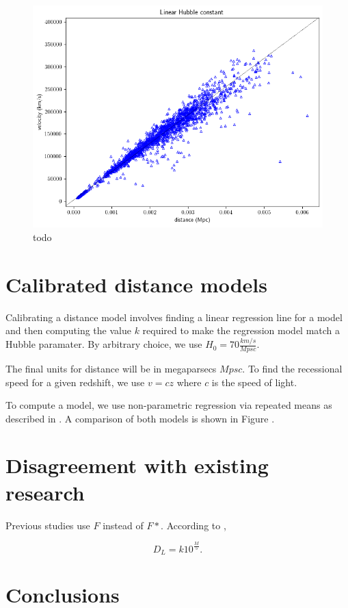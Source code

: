 \documentclass{article}
\begin{document}
\begin{figure}[h!]
  \includegraphics[width=\linewidth]{../graphs/velocity_vs_distance.png}
  \caption{todo}
  \label{fig:uncorrected_uncalibrated}
\end{figure}

\section{Calibrated distance models}
\label{sec:calibrated}

Calibrating a distance model involves finding a linear regression line for a
model and then computing the value $k$ required to make the regression model
match a Hubble paramater. By arbitrary choice, we use $H_0 = 70 \frac{km/s}{Mpsc}$.

The final units for distance will be in megaparsecs $Mpsc$. To find the
recessional speed for a given redshift, we use $v = cz$ where $c$ is the speed
of light.

To compute a model, we use non-parametric regression via repeated means as described in
\citet{siegel1982}. A comparison of both models is shown in Figure .


\section{Disagreement with existing research}

Previous studies use $F$ instead of $F*$. According to \citet{betoule2014},

\begin{equation}
  D_L = k 10^\frac{M}{5}.
\end{equation}

\section{Conclusions}
\label{sec:conclusions}



\end{document}
